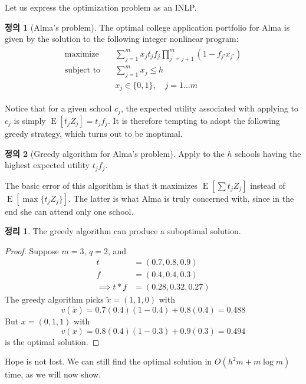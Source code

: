 \documentclass[12pt]{article} %
\newtheorem{theorem}{Theorem}
\theoremstyle{definition}
\newtheorem{definition}{Definition}
\newtheorem{theorem}{정리}
\theoremstyle{definition}
\newtheorem{definition}{정의}
\begin{document}
Let us express the optimization problem as an INLP.
\begin{definition}[Alma’s problem]
The optimal college application portfolio for Alma is given by the solution to the following integer nonlinear program:
\begin{align}
\begin{split}
\text{maximize}\quad & \sum_{j=1}^m x_j t_j f_j \prod_{j’ = j+1}^m (1 - f_{j’} x_{j’}) \\
\text{subject to}\quad & \sum_{j=1}^m x_j \leq h \\
&x_j \in \{0, 1\}, \quad j = 1\dots m
\end{split}
\end{align}
\end{definition}
Notice that for a given school $c_j$, the expected utility associated with applying to $c_j$ is simply $\operatorname{E}[t_j Z_j] = t_j f_j$. It is therefore tempting to adopt the following greedy strategy, which turns out to be inoptimal.
\begin{definition}[Greedy algorithm for Alma’s problem]
Apply to the $h$ schools having the highest expected utility $t_j f_j$.
\end{definition}
The basic error of this algorithm is that it maximizes $\operatorname{E}\left[\sum t_j Z_j \right]$ instead of $\operatorname{E}\left[\max \{t_j Z_j\} \right]$. The latter is what Alma is truly concerned with, since in the end she can attend only one school.
\begin{theorem}
The greedy algorithm can produce a suboptimal solution.
\end{theorem}
\begin{proof}
Suppose $m=3$, $q=2$, and
\begin{align*}
t &= (0.7, 0.8, 0.9) \\
f &= (0.4, 0.4, 0.3) \\
\implies t * f &= (0.28, 0.32, 0.27)
\end{align*}
The greedy algorithm picks $\tilde x = (1, 1, 0)$ with 
\[v(\tilde x) = 0.7(0.4)(1-0.4) + 0.8(0.4) = 0.488\]
But $x = (0 , 1, 1)$ with
\[v(x) = 0.8(0.4)(1-0.3) + 0.9(0.3) = 0.494\]
is the optimal solution.
\end{proof}
Hope is not lost. We can still find the optimal solution in $O(h^2 m + m\log m)$ time, as we will now show.
\end{document}
